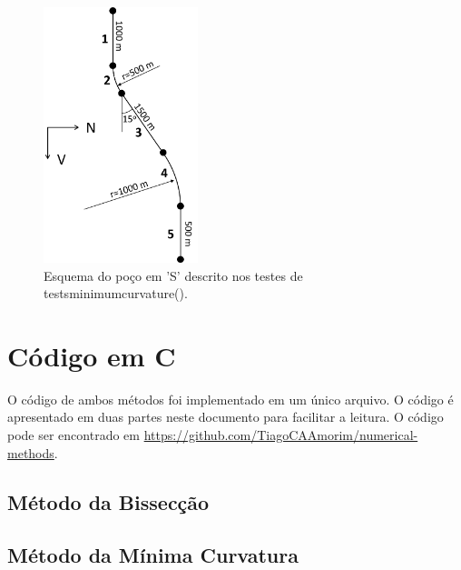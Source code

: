 \documentclass[final,3p,12pt]{elsarticle}
\begin{document}
\begin{figure}[hbt!]
    \label{fig:pocoS}
    \centering
    \includegraphics[width=0.4\textwidth]{EsquemaPoco}
    \caption{Esquema do poço em 'S' descrito nos testes de tests\textunderscore minimum\textunderscore curvature().}
\end{figure}

\newpage
\FloatBarrier
\section{Código em C}

O código de ambos métodos foi implementado em um único arquivo. O código é apresentado em duas partes neste documento para facilitar a leitura. O código pode ser encontrado em \href{https://github.com/TiagoCAAmorim/numerical-methods}{https://github.com/TiagoCAAmorim/numerical-methods}.

\subsection{Método da Bissecção}


\subsection{Método da Mínima Curvatura}

\end{document}
